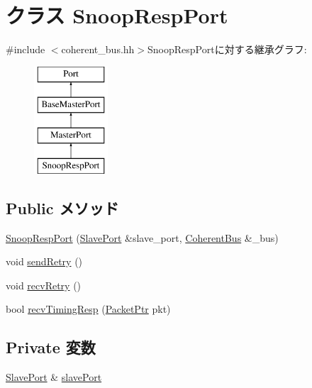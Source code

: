 \hypertarget{classCoherentBus_1_1SnoopRespPort}{
\section{クラス SnoopRespPort}
\label{classCoherentBus_1_1SnoopRespPort}
}


{\ttfamily \#include $<$coherent\_\-bus.hh$>$}SnoopRespPortに対する継承グラフ:\begin{figure}[H]
\begin{center}
\leavevmode
\includegraphics[height=4cm]{classCoherentBus_1_1SnoopRespPort}
\end{center}
\end{figure}
\subsection*{Public メソッド}
\begin{DoxyCompactItemize}
\item 
\hyperlink{classCoherentBus_1_1SnoopRespPort_ac24e511efb0df65ac078ae0d4bde34b2}{SnoopRespPort} (\hyperlink{classSlavePort}{SlavePort} \&slave\_\-port, \hyperlink{classCoherentBus}{CoherentBus} \&\_\-bus)
\item 
void \hyperlink{classCoherentBus_1_1SnoopRespPort_a6172657b944e32a722d90a20c5896bb7}{sendRetry} ()
\item 
void \hyperlink{classCoherentBus_1_1SnoopRespPort_a29cb5a4f98063ce6e9210eacbdb35298}{recvRetry} ()
\item 
bool \hyperlink{classCoherentBus_1_1SnoopRespPort_a482dba5588f4bee43e498875a61e5e0b}{recvTimingResp} (\hyperlink{classPacket}{PacketPtr} pkt)
\end{DoxyCompactItemize}
\subsection*{Private 変数}
\begin{DoxyCompactItemize}
\item 
\hyperlink{classSlavePort}{SlavePort} \& \hyperlink{classCoherentBus_1_1SnoopRespPort_af8e5dfce1f3b07a01c692d32d655bcf6}{slavePort}
\end{DoxyCompactItemize}


